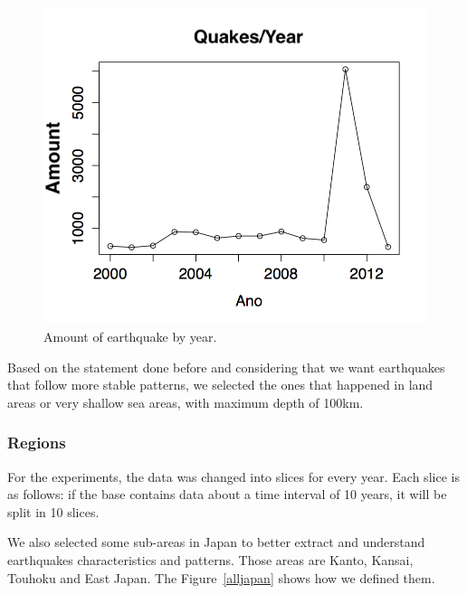 \begin{figure}[]
\centering
\includegraphics[scale=0.5]{img/ocorrenciasAno.png}
\caption{Amount of earthquake by year.}
\label{ocorrenciasAno}
\end{figure}

Based on the statement done before and considering that we want earthquakes that follow more stable patterns, we selected the ones that happened in land areas or very shallow sea areas, with maximum depth of 100km.

\subsubsection{Regions}
For the experiments, the data was changed into slices for every year. Each slice is as follows: if the base contains data about a time interval of 10 years, it will be split in 10 slices.

We also selected some sub-areas in Japan to better extract and understand earthquakes characteristics and patterns. Those areas are Kanto, Kansai, Touhoku and East Japan. The Figure~\ref{alljapan} shows how we defined them. 

